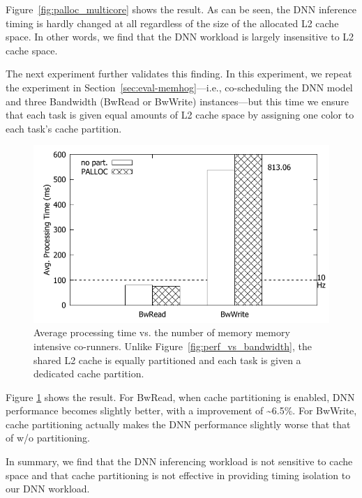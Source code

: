 Figure~\ref{fig:palloc_multicore} shows the result. As can be seen,
the DNN inference timing is hardly changed at all regardless of the
size of the allocated L2 cache space. In other words, we find that
the DNN workload is largely insensitive to L2 cache space.

The next experiment further validates this finding. In this
experiment, we repeat the experiment in
Section~\ref{sec:eval-memhog}---i.e., co-scheduling the DNN model and
three Bandwidth (BwRead or BwWrite) instances---but this time we
ensure that each task is given equal amounts of L2 cache space by
assigning one color to each task's cache partition.

\begin{figure}[h]
  \centering
  \includegraphics[width=.45\textwidth]{figs/palloc_bandwidth_exectime}
  \caption{Average processing time vs. the number of memory
memory intensive co-runners. Unlike
Figure~\ref{fig:perf_vs_bandwidth}, the shared L2 cache is equally
partitioned and each task is given a dedicated cache
partition. }
  \label{fig:palloc_bandwidth_exectime}
\end{figure}

Figure \ref{fig:palloc_bandwidth_exectime} shows the
result. For BwRead, when cache partitioning is enabled, DNN
performance becomes slightly better, with a improvement of  
\textasciitilde6.5\%. For BwWrite, cache partitioning actually makes
the DNN performance slightly worse that that of w/o partitioning.

In summary, we find that the DNN inferencing workload is not sensitive
to cache space and that cache partitioning is not effective in
providing timing isolation to our DNN workload.


